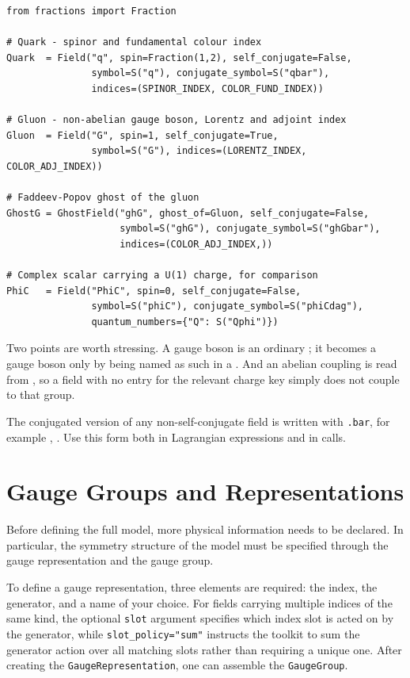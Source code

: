 \begin{verbatim}
from fractions import Fraction

# Quark - spinor and fundamental colour index
Quark  = Field("q", spin=Fraction(1,2), self_conjugate=False,
               symbol=S("q"), conjugate_symbol=S("qbar"),
               indices=(SPINOR_INDEX, COLOR_FUND_INDEX))

# Gluon - non-abelian gauge boson, Lorentz and adjoint index
Gluon  = Field("G", spin=1, self_conjugate=True,
               symbol=S("G"), indices=(LORENTZ_INDEX, COLOR_ADJ_INDEX))

# Faddeev-Popov ghost of the gluon
GhostG = GhostField("ghG", ghost_of=Gluon, self_conjugate=False,
                    symbol=S("ghG"), conjugate_symbol=S("ghGbar"),
                    indices=(COLOR_ADJ_INDEX,))

# Complex scalar carrying a U(1) charge, for comparison
PhiC   = Field("PhiC", spin=0, self_conjugate=False,
               symbol=S("phiC"), conjugate_symbol=S("phiCdag"),
               quantum_numbers={"Q": S("Qphi")})
\end{verbatim}

\noindent Two points are worth stressing. A gauge boson is an ordinary ; it becomes a gauge boson only by being named as such in a . And an abelian coupling is read from , so a field with no entry for the relevant charge key simply does not couple to that group.

\begin{tcolorbox}[notebox, title=Note]
The conjugated version of any non-self-conjugate field is written with \texttt{.bar}, for example , .  Use this form both in Lagrangian expressions and in  calls. 
\end{tcolorbox}

\section{Gauge Groups and Representations}
\label{sec:feynpy-gauge}
Before defining the full model, more physical information needs to be declared. In particular, the symmetry structure of the model must be specified through the gauge representation and the gauge group.

To define a gauge representation, three elements are required: the index, the generator, and a name of your choice. For fields carrying multiple indices of the same kind, the optional \texttt{slot} argument specifies which index slot is acted on by the generator, while \texttt{slot\_policy="sum"} instructs the toolkit to sum the generator action over all matching slots rather than requiring a unique one. After creating the \texttt{GaugeRepresentation}, one can assemble the \texttt{GaugeGroup}.
